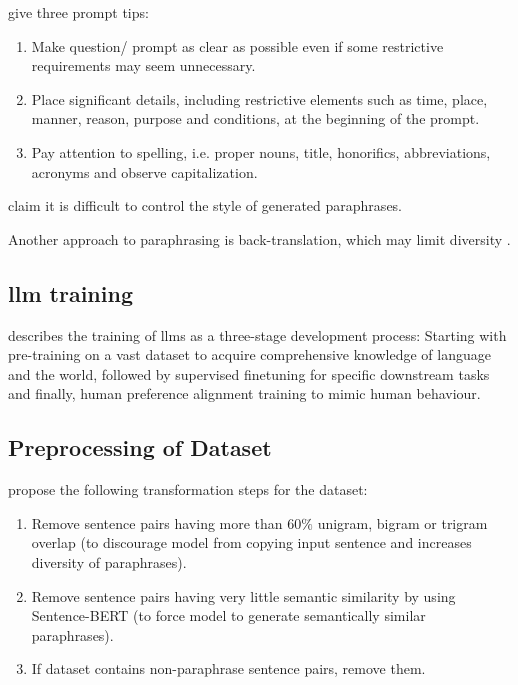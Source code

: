 \citet{fu_learning_2024} give three prompt tips:
\begin{enumerate}
    \item Make question/ prompt as clear as possible even if some restrictive requirements may seem unnecessary.
    \item Place significant details, including restrictive elements such as time, place, manner, reason, purpose and conditions, at the beginning of the prompt.
    \item Pay attention to spelling, i.e. proper nouns, title, honorifics, abbreviations, acronyms and observe capitalization.
\end{enumerate}

\citet{zhou_paraphrase_2021} claim it is difficult to control the style of generated paraphrases.

Another approach to paraphrasing is back-translation, which may limit diversity \citep{zhou_paraphrase_2025}.


\subsection{\ac{llm} training}

\citet{master_thesis_paraphrasing_2024} describes the training of \acp{llm} as a three-stage development process:
Starting with pre-training on a vast dataset to acquire comprehensive knowledge of language and the world, 
followed by supervised finetuning for specific downstream tasks and finally,
human preference alignment training to mimic human behaviour.

\subsection{Preprocessing of Dataset}

\citet{palivela_optimization_2021} propose the following transformation steps for the dataset:
\begin{enumerate}
    \item Remove sentence pairs having more than 60$\%$ unigram, bigram or trigram overlap 
    (to discourage model from copying input sentence and increases diversity of paraphrases).
    \item Remove sentence pairs having very little semantic similarity by using Sentence-BERT 
    (to force model to generate semantically similar paraphrases).
    \item If dataset contains non-paraphrase sentence pairs, remove them.   
\end{enumerate}

